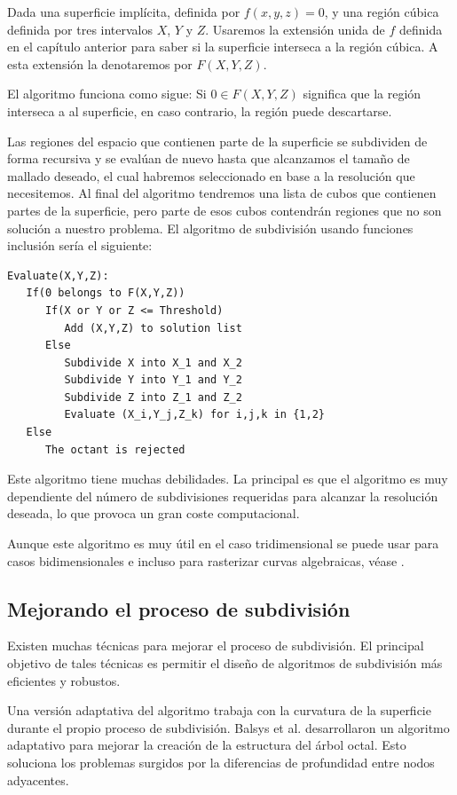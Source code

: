 Dada una superficie implícita, definida por $f(x,y,z) = 0$, y una región cúbica definida por tres intervalos $X$, $Y$ y $Z$. Usaremos la extensión unida de $f$ definida en el capítulo anterior para saber si la superficie interseca a la región cúbica. A esta extensión la denotaremos por $F(X,Y,Z)$.

El algoritmo funciona como sigue: Si $0 \in F(X,Y,Z)$ significa que la región interseca a al superficie, en caso contrario, la región puede descartarse.

Las regiones del espacio que contienen parte de la superficie se subdividen de forma recursiva y se evalúan de nuevo hasta que alcanzamos el tamaño de mallado deseado, el cual habremos seleccionado en base a la resolución que necesitemos. Al final del algoritmo tendremos una lista de cubos que contienen partes de la superficie, pero parte de esos cubos contendrán regiones que no son solución a nuestro problema. El algoritmo de subdivisión usando funciones inclusión sería el siguiente:
\begin{verbatim}
Evaluate(X,Y,Z):
   If(0 belongs to F(X,Y,Z))
      If(X or Y or Z <= Threshold)
         Add (X,Y,Z) to solution list
      Else
         Subdivide X into X_1 and X_2
         Subdivide Y into Y_1 and Y_2
         Subdivide Z into Z_1 and Z_2
         Evaluate (X_i,Y_j,Z_k) for i,j,k in {1,2}
   Else
      The octant is rejected
\end{verbatim}

Este algoritmo tiene muchas debilidades. La principal es que el algoritmo es muy dependiente del número de subdivisiones requeridas para alcanzar la resolución deseada, lo que provoca un gran coste computacional.

Aunque este algoritmo es muy útil en el caso tridimensional se puede usar para casos bidimensionales e incluso para rasterizar curvas algebraicas, véase \cite{Oliveira00,Taubin94}.

\subsection{Mejorando el proceso de subdivisión}

Existen muchas técnicas para mejorar el proceso de subdivisión. El principal objetivo de tales técnicas es permitir el diseño de algoritmos de subdivisión más eficientes y robustos.

Una versión adaptativa del algoritmo trabaja con la curvatura de la superficie durante el propio proceso de subdivisión. Balsys et al. \cite{Balsys01} desarrollaron un algoritmo adaptativo para mejorar la creación de la estructura del árbol octal. Esto soluciona los problemas surgidos por la diferencias de profundidad entre nodos adyacentes.

